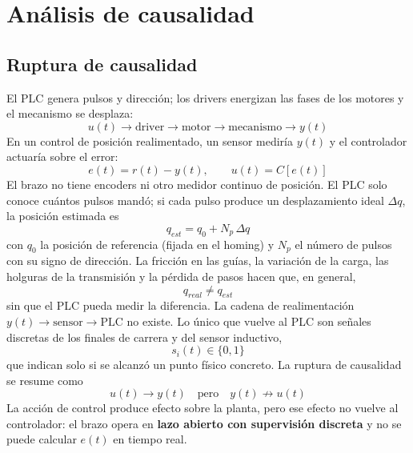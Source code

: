 \documentclass[a4paper,11pt]{article}
\begin{document}
\section{Análisis de causalidad}
\subsection{Ruptura de causalidad}\label{sec:ruptura}
El PLC genera pulsos y dirección; los drivers energizan las fases de los motores y el mecanismo se desplaza:
\begin{equation}
u(t) \rightarrow \text{driver} \rightarrow \text{motor} \rightarrow \text{mecanismo} \rightarrow y(t)
\end{equation}
En un control de posición realimentado, un sensor mediría $y(t)$ y el controlador actuaría sobre el error:
\begin{equation}
e(t) = r(t) - y(t), \qquad u(t) = C[e(t)]
\end{equation}
El brazo no tiene encoders ni otro medidor continuo de posición. El PLC solo conoce cuántos pulsos mandó; si cada pulso produce un desplazamiento ideal $\Delta q$, la posición estimada es
\begin{equation}
q_{est} = q_0 + N_p\,\Delta q
\end{equation}
con $q_0$ la posición de referencia (fijada en el homing) y $N_p$ el número de pulsos con su signo de dirección. La fricción en las guías, la variación de la carga, las holguras de la transmisión y la pérdida de pasos hacen que, en general,
\begin{equation}
q_{real} \neq q_{est}
\end{equation}
sin que el PLC pueda medir la diferencia. La cadena de realimentación $y(t) \rightarrow \text{sensor} \rightarrow \text{PLC}$ no existe. Lo único que vuelve al PLC son señales discretas de los finales de carrera y del sensor inductivo,
\begin{equation}
s_i(t) \in \{0, 1\}
\end{equation}
que indican solo si se alcanzó un punto físico concreto. La ruptura de causalidad se resume como
\begin{equation}
u(t) \rightarrow y(t) \quad \text{pero} \quad y(t) \not\rightarrow u(t)
\end{equation}
La acción de control produce efecto sobre la planta, pero ese efecto no vuelve al controlador: el brazo opera en \textbf{lazo abierto con supervisión discreta} y no se puede calcular $e(t)$ en tiempo real.
\end{document}
